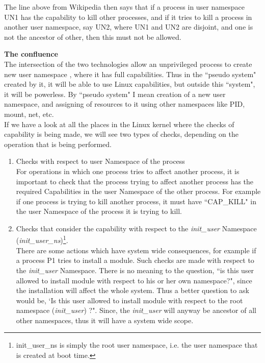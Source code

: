 \documentclass[twoside]{iitbreport}
\begin{document}
The line above from Wikipedia then says that if a process in user namespace UN1 has the capability to kill other processes, and if it tries to kill a process in another user namespace, say UN2, where UN1 and UN2 are disjoint, and one is not the ancestor of other, then this must not be allowed.

\textbf{The confluence}\\
The intersection of the two technologies allow an unprivileged process to create new user namespace , where it has full capabilities. Thus in the ``pseudo system" created by it, it will be able to use Linux capabilities, but outside this ``system", it will be powerless. By ``pseudo system" I mean creation of a new user namespace, and assigning of resources to it using other namespaces like PID, mount, net, etc.\\
If we have a look at all the places in the Linux kernel where the checks of capability is being made, we will see two types of checks, depending on the operation that is being performed.

\begin{enumerate}
\item Checks with respect to user Namespace of the process\\
For operations in which one process tries to affect another process, it is important to check that the process trying to affect another process has the required Capabilities in the user Namespace of the other process. For example if one process is trying to kill another process, it must have ``CAP\_KILL" in the user Namespace of the process it is trying to kill.

\item Checks that consider the capability with respect to the \textit{init\_user} Namespace\\ (\textit{init\_user\_ns})\footnote{init\_user\_ns is simply the root user namespace, i.e. the user namespace that is created at boot time.}.\\
There are some actions which have system wide consequences, for example if a process P1 tries to install a module. Such checks are made with respect to the \textit{init\_user} Namespace. There is no meaning to the question, ``is this user allowed to install module with respect to his or her own namespace?", since the installation will affect the whole system. Thus a better question to ask would be, `Is this user allowed to install module with respect to the root namespace (\textit{init\_user}) ?". Since, the \textit{init\_user} will anyway be ancestor of all other namespaces, thus it will have a system wide scope.	
\end{enumerate}
\end{document}
